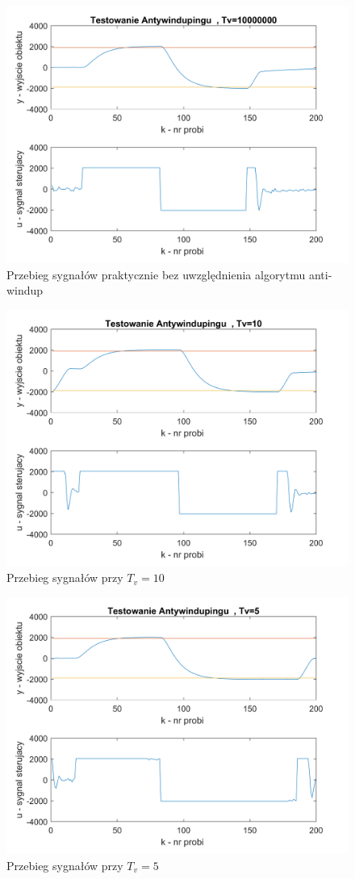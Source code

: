 \documentclass[a4paper, 10pt]{article}
\begin{document}
\begin{figure}[H]
	\centering
	\includegraphics[width=0.9\linewidth]{awbez}
	\caption{Przebieg sygnałów praktycznie bez uwzględnienia algorytmu anti-windup}
	\label{fig:awbez}
\end{figure}

\begin{figure}[H]
	\centering
	\includegraphics[width=0.9\linewidth]{aw10}
	\caption{Przebieg sygnałów przy $T_{v}=10$}
	\label{fig:aw10}
\end{figure}

\begin{figure}[H]
	\centering
	\includegraphics[width=0.9\linewidth]{aw5}
	\caption{Przebieg sygnałów przy $T_{v}=5$}
	\label{fig:aw5}
\end{figure}
\end{document}
